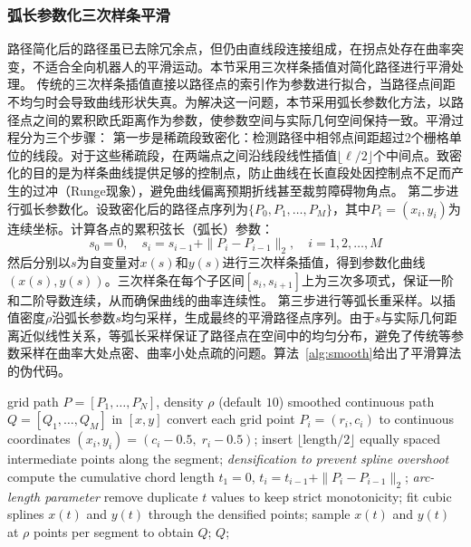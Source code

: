 \documentclass[lettersize,journal]{IEEEtran}
\begin{document}
\subsubsection{弧长参数化三次样条平滑}
路径简化后的路径虽已去除冗余点，但仍由直线段连接组成，在拐点处存在曲率突变，不适合全向机器人的平滑运动。本节采用三次样条插值对简化路径进行平滑处理。
传统的三次样条插值直接以路径点的索引作为参数进行拟合，当路径点间距不均匀时会导致曲线形状失真。为解决这一问题，本节采用弧长参数化方法，以路径点之间的累积欧氏距离作为参数，使参数空间与实际几何空间保持一致。平滑过程分为三个步骤：
第一步是稀疏段致密化：检测路径中相邻点间距超过2个栅格单位的线段。对于这些稀疏段，在两端点之间沿线段线性插值$\lfloor \ell / 2 \rfloor$个中间点。致密化的目的是为样条曲线提供足够的控制点，防止曲线在长直段处因控制点不足而产生的过冲（Runge现象），避免曲线偏离预期折线甚至裁剪障碍物角点。
第二步进行弧长参数化。设致密化后的路径点序列为$\{P_0, P_1, \ldots, P_M\}$，其中$P_i = (x_i, y_i)$为连续坐标。计算各点的累积弦长（弧长）参数：
\begin{equation}
s_0 = 0, \quad s_i = s_{i-1} + \|P_i - P_{i-1}\|_2, \quad i = 1, 2, \ldots, M
\label{eq:arclen}
\end{equation}
然后分别以$s$为自变量对$x(s)$和$y(s)$进行三次样条插值，得到参数化曲线$(x(s), y(s))$。三次样条在每个子区间$[s_i, s_{i+1}]$上为三次多项式，保证一阶和二阶导数连续，从而确保曲线的曲率连续性。
第三步进行等弧长重采样。以插值密度$\rho$沿弧长参数$s$均匀采样，生成最终的平滑路径点序列。由于$s$与实际几何距离近似线性关系，等弧长采样保证了路径点在空间中的均匀分布，避免了传统等参数采样在曲率大处点密、曲率小处点疏的问题。算法~\textcolor{blue}{\ref{alg:smooth}}给出了平滑算法的伪代码。
\begin{algorithm}[!t]
\caption{Arc-length parameterized cubic spline smoothing}
\label{alg:smooth}
\begin{algorithmic}[1]
\REQUIRE grid path $P = [P_1, \ldots, P_N]$, density $\rho$ (default $10$)
\ENSURE smoothed continuous path $Q = [Q_1, \ldots, Q_M]$ in $[x, y]$
\STATE convert each grid point $P_i = (r_i, c_i)$ to continuous coordinates $(x_i, y_i) = (c_i - 0.5,\; r_i - 0.5)$;
\STATE insert $\lfloor \mathrm{length} / 2 \rfloor$ equally spaced intermediate points along the segment; \quad\textit{densification to prevent spline overshoot}
\ENDFOR
\STATE compute the cumulative chord length $t_1 = 0$, $t_i = t_{i-1} + \|P_i - P_{i-1}\|_2$; \quad\textit{arc-length parameter}
\STATE remove duplicate $t$ values to keep strict monotonicity;
\STATE fit cubic splines $x(t)$ and $y(t)$ through the densified points;
\STATE sample $x(t)$ and $y(t)$ at $\rho$ points per segment to obtain $Q$;
\STATE \RETURN $Q$;
\end{algorithmic}
\end{algorithm}
\end{document}

